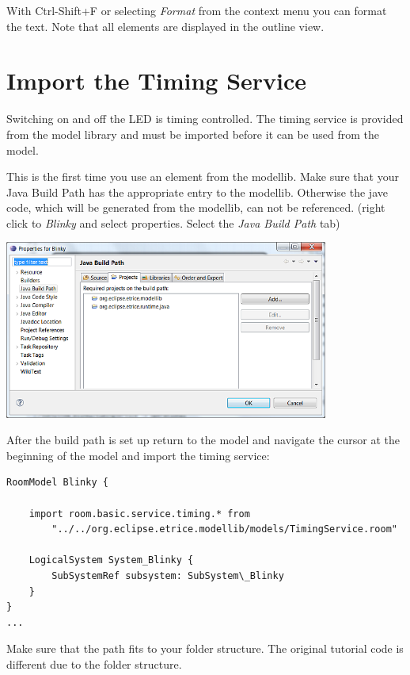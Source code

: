 With Ctrl-Shift+F or selecting \textit{Format} from the context menu you can format the text. Note that 
all elements are displayed in the outline view.

\section{Import the Timing Service}

Switching on and off the LED is timing controlled. The timing service is provided from the model library 
and must be imported before it can be used from the model.

This is the first time you use an element from the modellib. Make sure that your Java Build Path has the 
appropriate entry to the modellib. Otherwise the jave code, which will be generated from the modellib, can 
not be referenced.
(right click to \textit{Blinky} and select properties. Select the \textit{Java Build Path} tab) 
  
\includegraphics[width=0.8\textwidth]{images/020-Blinky16.png}

After the build path is set up return to the model and navigate the cursor at the beginning of the model 
and import the timing service: 

\begin{small}
\begin{verbatim}
RoomModel Blinky {
    
    import room.basic.service.timing.* from 
		"../../org.eclipse.etrice.modellib/models/TimingService.room" 
    
    LogicalSystem System_Blinky {
        SubSystemRef subsystem: SubSystem\_Blinky
    }
}
...     
\end{verbatim}
\end{small}

Make sure that the path fits to your folder structure. The original tutorial code is different due to the 
folder structure.  

